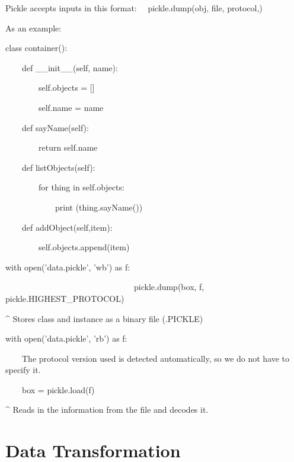 \documentclass[a4paper,12pt]{report}
\begin{document}
Pickle accepts inputs in this format: \ \ pickle.dump(obj, file, protocol,)

As an example: \ 
\bigskip

class container():

\ \ \ \ def \_\_init\_\_(self, name):

\ \ \ \ \ \ \ \ self.objects = []

\ \ \ \ \ \ \ \ self.name = name


\bigskip

\ \ \ \ def sayName(self):

\ \ \ \ \ \ \ \ return self.name


\bigskip

\ \ \ \ def listObjects(self):

\ \ \ \ \ \ \ \ for thing in self.objects:

\ \ \ \ \ \ \ \ \ \ \ \ print (thing.sayName())


\bigskip

\ \ \ \ def addObject(self,item):

\ \ \ \ \ \ \ \ self.objects.append(item)


\bigskip


with open('data.pickle', 'wb') as f:

\ \ \ \ \ \ \ \ \ \ \ \ \ \ \ \ \ \ \ \ \ \ \ \ \ \ \ \ \ \ \ pickle.dump(box, f, pickle.HIGHEST\_PROTOCOL)


\bigskip

\^{} Stores class and instance as a binary file (.PICKLE)


\bigskip


\bigskip

with open('data.pickle', 'rb') as f:

\ \ \ \ The protocol version used is detected automatically, so we do not have to specify it.

\ \ \ \ box = pickle.load(f)


\bigskip

\^{} Reads in the information from the file and decodes it.


\bigskip


\bigskip

\section{Data Transformation}


\bigskip
\end{document}
